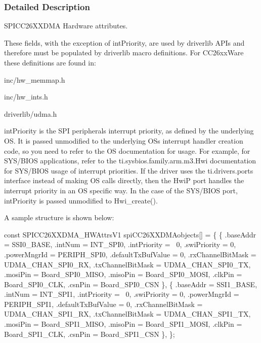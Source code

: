 \subsubsection{Detailed Description}
S\+P\+I\+C\+C26\+X\+X\+D\+M\+A Hardware attributes. 

These fields, with the exception of int\+Priority, are used by driverlib A\+P\+Is and therefore must be populated by driverlib macro definitions. For C\+C26xx\+Ware these definitions are found in\+:
\begin{DoxyItemize}
\item inc/hw\+\_\+memmap.\+h
\item inc/hw\+\_\+ints.\+h
\item driverlib/udma.\+h
\end{DoxyItemize}

int\+Priority is the S\+P\+I peripheral\textquotesingle{}s interrupt priority, as defined by the underlying O\+S. It is passed unmodified to the underlying O\+S\textquotesingle{}s interrupt handler creation code, so you need to refer to the O\+S documentation for usage. For example, for S\+Y\+S/\+B\+I\+O\+S applications, refer to the ti.\+sysbios.\+family.\+arm.\+m3.\+Hwi documentation for S\+Y\+S/\+B\+I\+O\+S usage of interrupt priorities. If the driver uses the ti.\+drivers.\+ports interface instead of making O\+S calls directly, then the Hwi\+P port handles the interrupt priority in an O\+S specific way. In the case of the S\+Y\+S/\+B\+I\+O\+S port, int\+Priority is passed unmodified to Hwi\+\_\+create().

A sample structure is shown below\+: 
\begin{DoxyCode}
\textcolor{keyword}{const} SPICC26XXDMA_HWAttrsV1 spiCC26XXDMAobjects[] = \{
    \{
        .baseAddr = SSI0\_BASE,
        .intNum = INT\_SPI0,
        .intPriority = ~0,
        .swiPriority = 0,
        .powerMngrId = PERIPH\_SPI0,
        .defaultTxBufValue = 0,
        .rxChannelBitMask = UDMA\_CHAN\_SPI0\_RX,
        .txChannelBitMask = UDMA\_CHAN\_SPI0\_TX,
        .mosiPin = Board\_SPI0\_MISO,
        .misoPin = Board\_SPI0\_MOSI,
        .clkPin = Board\_SPI0\_CLK,
        .csnPin = Board\_SPI0\_CSN
    \},
    \{
        .baseAddr = SSI1\_BASE,
        .intNum = INT\_SPI1,
        .intPriority = ~0,
        .swiPriority = 0,
        .powerMngrId = PERIPH\_SPI1,
        .defaultTxBufValue = 0,
        .rxChannelBitMask = UDMA\_CHAN\_SPI1\_RX,
        .txChannelBitMask = UDMA\_CHAN\_SPI1\_TX,
        .mosiPin = Board\_SPI1\_MISO,
        .misoPin = Board\_SPI1\_MOSI,
        .clkPin = Board\_SPI1\_CLK,
        .csnPin = Board\_SPI1\_CSN
    \},
\};
\end{DoxyCode}
 

